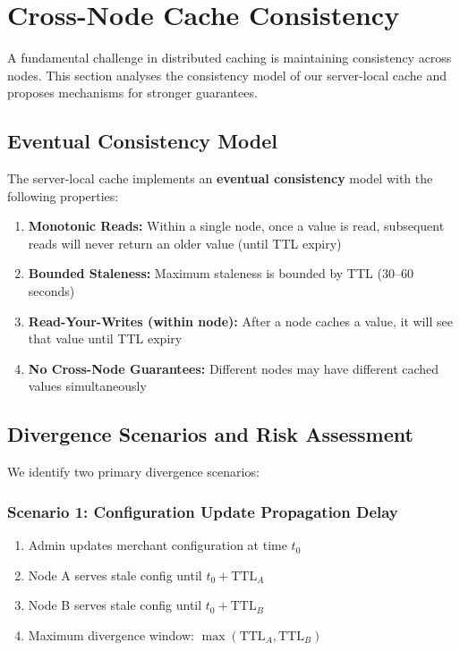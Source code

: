 \documentclass[12pt,a4paper]{report}
\begin{document}
\section{Cross-Node Cache Consistency}
\label{sec:consistency}

A fundamental challenge in distributed caching is maintaining consistency across nodes. This section analyses the consistency model of our server-local cache and proposes mechanisms for stronger guarantees.

\subsection{Eventual Consistency Model}

The server-local cache implements an \textbf{eventual consistency} model with the following properties:

\begin{enumerate}
    \item \textbf{Monotonic Reads:} Within a single node, once a value is read, subsequent reads will never return an older value (until TTL expiry)
    \item \textbf{Bounded Staleness:} Maximum staleness is bounded by TTL (30--60 seconds)
    \item \textbf{Read-Your-Writes (within node):} After a node caches a value, it will see that value until TTL expiry
    \item \textbf{No Cross-Node Guarantees:} Different nodes may have different cached values simultaneously
\end{enumerate}

\subsection{Divergence Scenarios and Risk Assessment}

We identify two primary divergence scenarios:

\subsubsection{Scenario 1: Configuration Update Propagation Delay}

\begin{enumerate}
    \item Admin updates merchant configuration at time $t_0$
    \item Node A serves stale config until $t_0 + \text{TTL}_A$
    \item Node B serves stale config until $t_0 + \text{TTL}_B$
    \item Maximum divergence window: $\max(\text{TTL}_A, \text{TTL}_B)$
\end{enumerate}
\end{document}
